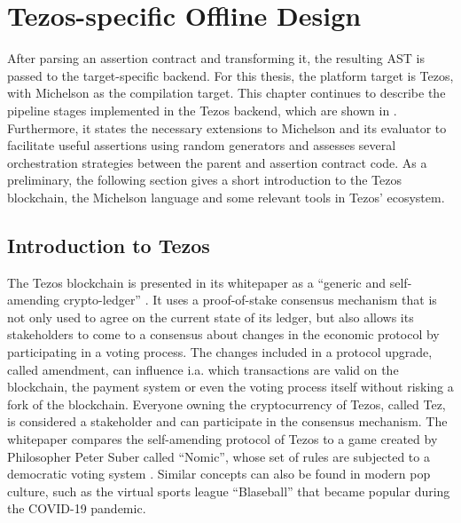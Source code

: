 \chapter{Tezos-specific Offline Design}\label{chap:offline_tezos}
After parsing an assertion contract and transforming it, the resulting AST is passed to the target-specific backend. For this thesis, the platform target is Tezos, with Michelson as the compilation target. This chapter continues to describe the pipeline stages implemented in the Tezos backend, which are shown in . Furthermore, it states the necessary extensions to Michelson and its evaluator to facilitate useful assertions using random generators and assesses several orchestration strategies between the parent and assertion contract code. As a preliminary, the following section gives a short introduction to the Tezos blockchain, the Michelson language and some relevant tools in Tezos' ecosystem.

\section{Introduction to Tezos}\label{sec:tezos}
The Tezos blockchain is presented in its whitepaper as a \enquote{generic and self-amending crypto-ledger} \cite{goodman_tezos_2014}. It uses a proof-of-stake consensus mechanism that is not only used to agree on the current state of its ledger, but also allows its stakeholders to come to a consensus about changes in the economic protocol by participating in a voting process. The changes included in a protocol upgrade, called amendment, can influence i.a. which transactions are valid on the blockchain, the payment system or even the voting process itself without risking a fork of the blockchain. Everyone owning the cryptocurrency of Tezos, called Tez, is considered a stakeholder and can participate in the consensus mechanism. The whitepaper compares the self-amending protocol of Tezos to a game created by Philosopher Peter Suber called ``Nomic'', whose set of rules are subjected to a democratic voting system \cite{nomic}. Similar concepts can also be found in modern pop culture, such as the virtual sports league ``Blaseball'' \cite{blaseball} that became popular during the COVID-19 pandemic.

